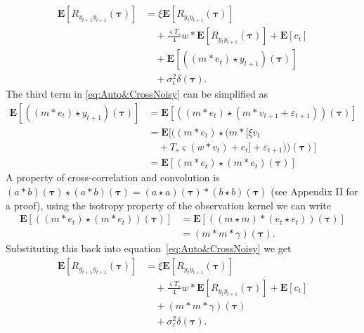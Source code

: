 \documentclass[conference,onecolumn]{IEEEtran}
\begin{document}
\begin{align}\label{eq:Auto&CrossNoisy}
	\mathbf{E}[R_{y_{t+1}y_{t+1}}(\boldsymbol{\tau})] &= \xi \mathbf{E}[R_{y_ty_{t+1}}(\boldsymbol{\tau})] \nonumber \\
	&\quad+  \frac{\varsigma T_s}{4} w \ast \mathbf{E}[R_{y_ty_{t+1}}(\boldsymbol\tau)]  + \mathbf{E}[c_t] \nonumber \\
	&\quad+\mathbf{E}[((m\ast e_t)\star y_{t+1})(\boldsymbol\tau)] \nonumber \\ 
	&\quad+\sigma_{\epsilon}^2\delta(\boldsymbol{\tau}).
\end{align}
The third term in \eqref{eq:Auto&CrossNoisy} can be simplified as
\begin{align}\label{eq:term3Noisy}
\mathbf{E}[((m\ast e_t)\star y_{t+1})(\boldsymbol\tau)] &= \mathbf{E}[((m\ast e_t)\star (m\ast v_{t+1}+\varepsilon_{t+1})) (\boldsymbol\tau)] \\
	&= \mathbf{E}[(\left(m \ast e_t\right) \star (m \ast [\xi v_t \nonumber \\
	&\quad+ T_s \varsigma \left(w \ast v_t\right) + e_t]+\varepsilon_{t+1}))(\boldsymbol\tau)] \\
	&=\mathbf{E}[\left(m \ast e_t\right)\star\left(m \ast e_t\right)(\boldsymbol\tau)]
\end{align}
A property of cross-correlation and convolution is $(a \ast b)(\boldsymbol\tau) \star (a \ast b)(\boldsymbol\tau)=(a \star a)(\boldsymbol\tau)\ast(b \star b)(\boldsymbol\tau)$ (see Appendix II for a proof), using the isotropy property of the observation kernel we can write
\begin{align}\label{eq:term4}
\mathbf{E}[(\left(m \ast e_t\right)\star\left(m \ast e_t\right))(\boldsymbol\tau)]&=\mathbf{E}[(\left(m \star m\right)\ast\left(e_t \star e_t\right))(\boldsymbol\tau)] \\
&=(m\ast m \ast \gamma)(\boldsymbol\tau).
\end{align}
Substituting this back into equation~\ref{eq:Auto&CrossNoisy} we get
\begin{align}
	\mathbf{E}[R_{y_{t+1}y_{t+1}}(\boldsymbol{\tau})] &= \xi \mathbf{E}[R_{y_ty_{t+1}}(\boldsymbol{\tau})] \nonumber \\
	&\quad+  \frac{\varsigma T_s}{4} w \ast \mathbf{E}[R_{y_ty_{t+1}}(\boldsymbol\tau)]  + \mathbf{E}[c_t] \nonumber \\
	&\quad+(m\ast m \ast \gamma)(\boldsymbol\tau) \nonumber \\ 
	&\quad+\sigma_{\varepsilon}^2\delta(\boldsymbol{\tau}).
\end{align}
\end{document}
